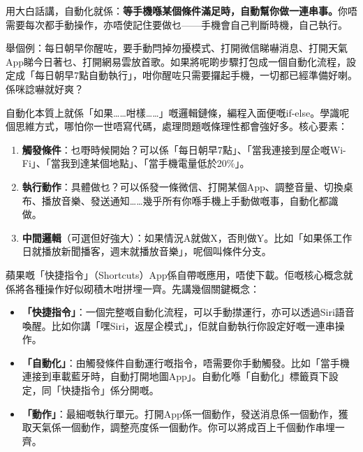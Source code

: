 


用大白話講，自動化就係：\textbf{等手機喺某個條件滿足時，自動幫你做一連串事。}你唔需要每次都手動操作，亦唔使記住要做乜——手機會自己判斷時機，自己執行。

舉個例：每日朝早你醒咗，要手動閂掉勿擾模式、打開微信睇嚇消息、打開天氣App睇今日著乜、打開網易雲放首歌。如果將呢啲步驟打包成一個自動化流程，設定成「每日朝早7點自動執行」，咁你醒咗只需要攞起手機，一切都已經準備好喇。係咪諗嚇就好爽？

自動化本質上就係「如果……咁樣……」嘅邏輯鏈條，編程入面便嘅if-else。學識呢個思維方式，哪怕你一世唔寫代碼，處理問題嘅條理性都會強好多。核心要素：

\begin{enumerate}
  \item \textbf{觸發條件}：乜嘢時候開始？可以係「每日朝早7點」、「當我連接到屋企嘅Wi-Fi」、「當我到達某個地點」、「當手機電量低於20\%」。
  \item \textbf{執行動作}：具體做乜？可以係發一條微信、打開某個App、調整音量、切換桌布、播放音樂、發送通知……幾乎所有你喺手機上手動做嘅事，自動化都識做。
  \item \textbf{中間邏輯}（可選但好強大）：如果情況A就做X，否則做Y。比如「如果係工作日就播放新聞播客，週末就播放音樂」，呢個叫條件分支。
\end{enumerate}


蘋果嘅「快捷指令」（Shortcuts）App係自帶嘅應用，唔使下載。佢嘅核心概念就係將各種操作好似砌積木咁拼埋一齊。先講幾個關鍵概念：

\begin{itemize}
  \item \textbf{「快捷指令」}：一個完整嘅自動化流程，可以手動㩒運行，亦可以透過Siri語音喚醒。比如你講「嘿Siri，返屋企模式」，佢就自動執行你設定好嘅一連串操作。
  \item \textbf{「自動化」}：由觸發條件自動運行嘅指令，唔需要你手動觸發。比如「當手機連接到車載藍牙時，自動打開地圖App」。自動化喺「自動化」標籤頁下設定，同「快捷指令」係分開嘅。
  \item \textbf{「動作」}：最細嘅執行單元。打開App係一個動作，發送消息係一個動作，獲取天氣係一個動作，調整亮度係一個動作。你可以將成百上千個動作串埋一齊。
\end{itemize}

